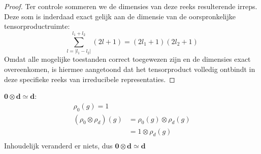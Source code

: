 \begin{proof}
    Ter controle sommeren we de dimensies van deze reeks resulterende irreps. Deze som is inderdaad exact gelijk aan de dimensie van de oorspronkelijke tensorproductruimte:
    \[
    \sum_{l=|l_1-l_2|}^{l_1+l_2} (2l + 1) = (2l_1 + 1)(2l_2 + 1)
    \]
    Omdat alle mogelijke toestanden correct toegewezen zijn en de dimensies exact overeenkomen, is hiermee aangetoond dat het tensorproduct volledig ontbindt in deze specifieke reeks van irreducibele representaties.
\end{proof}


\begin{example}
    \(\bm 0 \otimes \bm d \simeq \bm d\):
    \begin{align*}
        \rho_0(g) = 1  \\
        (\rho_0 \otimes \rho_d)(g) &= \rho_0(g) \otimes \rho_d(g)\\
        &= 1 \otimes \rho_d(g) \\
    \end{align*}
    Inhoudelijk veranderd er niets, dus \(\bm 0 \otimes \bm d \simeq \bm d\)
\end{example}